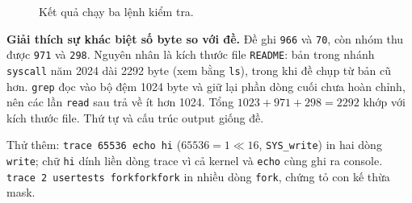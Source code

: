 \documentclass[12pt,a4paper]{article}
\newcommand{\code}[1]{\texttt{#1}}
\begin{document}
\begin{figure}[h]
\centering
\caption{Kết quả chạy ba lệnh kiểm tra.}
\end{figure}

\textbf{Giải thích sự khác biệt số byte so với đề.} Đề ghi \code{966} và \code{70}, còn nhóm thu được \code{971} và \code{298}. Nguyên nhân là kích thước file \code{README}: bản trong nhánh \code{syscall} năm 2024 dài 2292 byte (xem bằng \code{ls}), trong khi đề chụp từ bản cũ hơn. \code{grep} đọc vào bộ đệm 1024 byte và giữ lại phần dòng cuối chưa hoàn chỉnh, nên các lần \code{read} sau trả về ít hơn 1024. Tổng $1023+971+298=2292$ khớp với kích thước file. Thứ tự và cấu trúc output giống đề.

Thử thêm: \code{trace 65536 echo hi} ($65536=1\ll16$, \code{SYS\_write}) in hai dòng \code{write}; chữ \code{hi} dính liền dòng trace vì cả kernel và \code{echo} cùng ghi ra console. \code{trace 2 usertests forkforkfork} in nhiều dòng \code{fork}, chứng tỏ con kế thừa mask.

\end{document}
